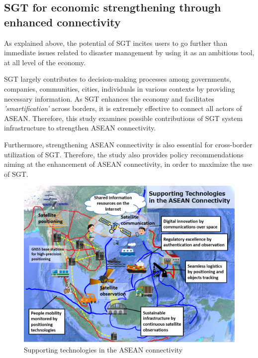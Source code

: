 \subsection{SGT for economic strengthening through enhanced connectivity} \label{enhanced}

As explained above, the potential of SGT incites users to go further than immediate issues related to disaster management by using it as an ambitious tool, at all level of the economy.

\vspace{0.4 cm}

SGT largely contributes to decision-making processes among governments, companies, communities, cities, individuals in various contexts by providing necessary information. As SGT enhances the economy and facilitates \textit{'smartification'} across borders, it is extremely effective to connect all actors of ASEAN. Therefore, this study examines possible contributions of SGT system infrastructure to strengthen ASEAN connectivity.

\vspace{0.4 cm}

Furthermore, strengthening ASEAN connectivity is also essential for cross-border utilization of SGT. Therefore, the study also provides policy recommendations aiming at the enhancement of ASEAN connectivity, in order to maximize the use of SGT.

\begin{figure}[H]
\begin{center}
\includegraphics[width = 0.8\linewidth]{Figures/supp_connect.png}
\end{center}
\caption{Supporting technologies in the ASEAN connectivity}
\label{supp_connect}
\end{figure}

